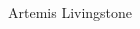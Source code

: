 \documentclass[
	9pt, %
]{FreemanCV}
\begin{document}
\begin{paracol}{2} %


\parbox[][0.08\textheight][c]{\linewidth}{ %
	\centering %
	
	\vspace*{\fill}
	\sffamily\Huge Artemis Livingstone  %
	\vspace*{\fill}
	\vfill
	
}









\end{paracol}
\end{document}
